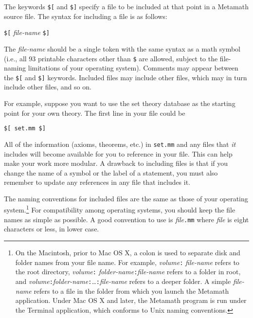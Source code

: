 The keywords \texttt{\$[} and \texttt{\$]} specify a file to be
included at that point in a
Metamath source file.  The syntax for
including a file is as follows:
\begin{center}
\texttt{\$[} {\em file-name} \texttt{\$]}
\end{center}

The {\em file-name} should be a single token with the same syntax
as a math symbol (i.e., all 93 printable characters other than \texttt{\$} are
allowed, subject to the file-naming limitations of your operating system).
Comments may appear between the \texttt{\$[} and \texttt{\$]} keywords.  Included
files may include other files, which may in turn include other files, and so
on.

For example, suppose you want to use the set theory database as the starting
point for your own theory.  The first line in your file could be
\begin{center}
\texttt{\$[ set.mm \$]}
\end{center} All of the information (axioms, theorems,
etc.) in \texttt{set.mm} and any files that {\em it} includes will become
available for you to reference in your file. This can help make your work more
modular. A drawback to including files is that if you change the name of a
symbol or the label of a statement, you must also remember to update any
references in any file that includes it.


The naming conventions for included files are the same as those of your
operating system.\footnote{On the Macintosh, prior to Mac OS X,
 a colon is used to separate disk
and folder names from your file name.  For example, {\em volume}\texttt{:}{\em
file-name} refers to the root directory, {\em volume}\texttt{:}{\em
folder-name}\texttt{:}{\em file-name} refers to a folder in root, and {\em
volume}\texttt{:}{\em folder-name}\texttt{:}\ldots\texttt{:}{\em file-name} refers to a
deeper folder.  A simple {\em file-name} refers to a file in the folder from
which you launch the Metamath application.  Under Mac OS X and later,
the Metamath program is run under the Terminal application, which
conforms to Unix naming conventions.}\label{includef} For compatibility among
operating systems, you should keep the file names as simple as possible.  A
good convention to use is {\em file}\texttt{.mm} where {\em file} is eight
characters or less, in lower case.

